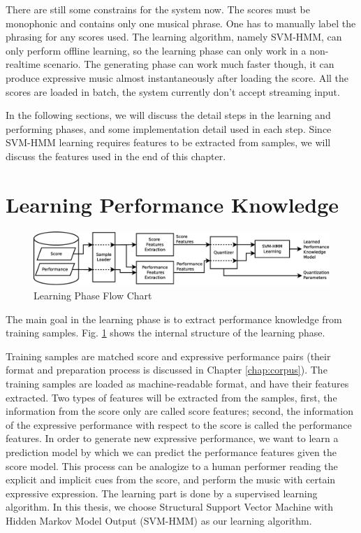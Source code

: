 There are still some constrains for the system now. The scores must be monophonic and contains only one musical phrase. One has to manually label the phrasing for any scores used. The learning algorithm, namely SVM-HMM, can only perform offline learning, so the learning phase can only work in a non-realtime scenario. The generating phase can work much faster though, it can produce expressive music almost instantaneously after loading the score. All the scores are loaded in batch, the system currently don't accept streaming input.

In the following sections, we will discuss the detail steps in the learning and performing phases, and some implementation detail used in each step. Since SVM-HMM learning requires features to be extracted from samples, we will discuss the features used in the end of this chapter.


\section{Learning Performance Knowledge}
\label{sec:learn}
\begin{figure}[tp]
   \begin{center}
      \includegraphics[width=\textwidth]{fig/learn_arch}
   \end{center}
   \caption{Learning Phase Flow Chart} 
   \label{fig:learnflow}
\end{figure}
The main goal in the learning phase is to extract performance knowledge from training samples. Fig. \ref{fig:learnflow} shows the internal structure of the learning phase.

   Training samples are matched score and expressive performance pairs (their format and preparation process is discussed in Chapter \ref{chap:corpus}). The training samples are loaded as machine-readable format, and have their features extracted. Two types of features will be extracted from the samples, first, the information from the score only are called score features; second, the information of the expressive performance with respect to the score is called the performance features. In order to generate new expressive performance, we want to learn a prediction model by which we can predict the performance features given the score model. This process can be analogize to a human performer reading the explicit and implicit cues from the score, and perform the music with certain expressive expression. The learning part is done by a supervised learning algorithm. In this thesis, we choose Structural Support Vector Machine with Hidden Markov Model Output (SVM-HMM) as our learning algorithm.


